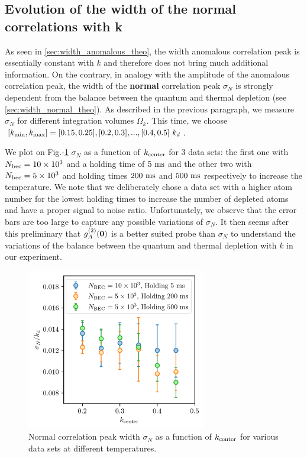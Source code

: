 \subsection{Evolution of the width of the normal correlations with k}

As seen in \ref{sec:width_anomalous_theo}, the width anomalous correlation peak is essentially constant with $k$ and therefore does not bring much additional information. On the contrary, in analogy with the amplitude of the anomalous correlation peak, the width of the \textbf{normal} correlation peak $\sigma_N$ is strongly dependent from the balance between the quantum and thermal depletion (see \ref{sec:width_normal_theo}). As described in the previous paragraph, we measure $\sigma_N$ for different integration volumes $\Omega_k$. This time, we choose $[k_{\rm{min}},k_{\rm{max}}]=[0.15,0.25],[0.2,0.3],...,[0.4,0.5] \ k_d$.

We plot on Fig.-\ref{fig:sigma_N_vs_k} $\sigma_N$ as a function of $k_{\rm{center}}$ for 3 data sets: the first one with $N_{\rm{bec}}=10 \times 10^3$ and a holding time of $5 \ \rm{ms}$ and the other two with $N_{\rm{bec}}=5 \times 10^3$ and holding times $200 \ \rm{ms}$ and $500 \ \rm{ms}$ respectively to increase the temperature. We note that we deliberately chose a data set with a higher atom number for the lowest holding times to increase the number of depleted atoms and have a proper signal to noise ratio. Unfortunately, we observe that the error bars are too large to capture any possible variations of $\sigma_N$. It then seems after this preliminary that $g^{(2)}_A (\bm{0})$ is a better suited probe than $\sigma_N$ to understand the variations of the balance between the quantum and thermal depletion with $k$ in our experiment.

\begin{figure}
    \centering
    \includegraphics[width=0.7\textwidth]{Fig/Chapter4/sigma_N_vs_k.png}
    \caption[Evolution of the normal correlation peak width $\sigma_N$ with $k$]{Normal correlation peak width $\sigma_N$ as a function of $k_{\rm{center}}$ for various data sets at different temperatures.}
    \label{fig:sigma_N_vs_k}
\end{figure}

